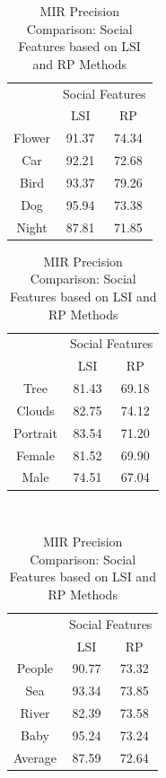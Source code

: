 \begin{table}[!ht]
  \caption{ MIR Precision Comparison: Social Features based on LSI and RP Methods} %
  \centering
  \begin{tabular}{|c|c|c|}
  \hline
   {\multirow{2}{*}{Labels}} & \multicolumn{2}{|c|}{Social Features} \\
   \cline{2-3}
    & LSI & RP \\ 
    \hline
Flower &  91.37 & 74.34 \\  [1ex] \hline
Car &  92.21 & 72.68  \\  [1ex] \hline
Bird & 93.37 & 79.26  \\  [1ex] \hline
Dog &  95.94 & 73.38 \\  [1ex] \hline
Night & 87.81 & 71.85  \\  [1ex] \hline
 \end{tabular}
 \hspace{1em}\vspace*{0.5cm}
 \begin{tabular}{|c|c|c|}
  \hline
{\multirow{2}{*}{Labels}} & \multicolumn{2}{|c|}{Social Features} \\ \cline{2-3}
 & LSI & RP \\ \hline
Tree &  81.43 & 69.18  \\  [1ex] \hline
Clouds & 82.75 & 74.12  \\  [1ex] \hline
Portrait & 83.54 & 71.20  \\  [1ex] \hline
Female & 81.52 & 69.90  \\  [1ex] \hline
Male &  74.51 & 67.04  \\  [1ex] \hline
\end{tabular}
 \hspace{1em}\vspace*{0.5cm}
\\
 \begin{tabular}{|c|c|c|}
  \hline
   {\multirow{2}{*}{Labels}} & \multicolumn{2}{|c|}{Social  Features} \\
   \cline{2-3}
    & LSI & RP \\ 
    \hline
 People &  90.77 & 73.32  \\  [1ex] \hline
Sea &  93.34 & 73.85  \\  [1ex] \hline
River &  82.39 & 73.58  \\  [1ex] \hline
Baby & 95.24 & 73.24  \\  [1ex] \hline
Average &  87.59 & 72.64  \\  [1ex] \hline
\end{tabular}
 \label{MIRPrecisionSocialFeatures} %
\end{table}
